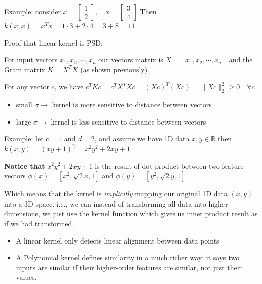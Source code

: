 \documentclass{article}
\begin{document}

Example: consider  
$
x = \begin{bmatrix} 1 \\ 2 \end{bmatrix}, \quad
\bar{x} = \begin{bmatrix} 3 \\ 4 \end{bmatrix}
$
Then $k(x, \bar{x}) = x^T \bar{x} = 1 \cdot 3 + 2 \cdot 4 = 3 + 8 = 11$

Proof that linear kernel is PSD:

For input vectors $x_1, x_2, \cdots, x_n$ our vectors matrix is $X = [x_1, x_2, \cdots, x_n]$ and the Gram matrix $K = X^T X$ (as shown previously)

For any vector $c$, we have $c^T K c = c^T X^T X c = (Xc)^T (Xc) = \|Xc\|_2^2 \geq 0 \quad \forall c$

\begin{itemize}
    \item small $\sigma \to$ kernel is more sensitive to distance between vectors 
    \item large $\sigma \to$ kernel is less sensitive to distance between vectors 
\end{itemize}

Example: let $c=1$ and $d=2$, and assume we have 1D data $x,y \in \mathbb{R}$ then $k(x,y) = (xy + 1)^2 = x^2y^2 + 2xy + 1$

\textbf{Notice that }$x^2y^2 + 2xy + 1$ is the result of dot product between two feature vectors $\phi(x) = [x^2 , \sqrt{2} x, 1]$ and $\phi(y) = [y^2 , \sqrt{2} y, 1]$

Which means that the kernel is \textit{implicitly} mapping our original 1D data $(x,y)$ into a 3D space. i.e., we can instead of transforming all data into higher dimensions, we just use the kernel function which gives us inner product result as if we had transformed.
\begin{itemize}
    \item A linear kernel only detects linear alignment between data points
    \item A Polynomial kernel defines similarity in a much richer way: it says two inputs are similar if their higher-order features are similar, not just their values.
\end{itemize}
\end{document}
